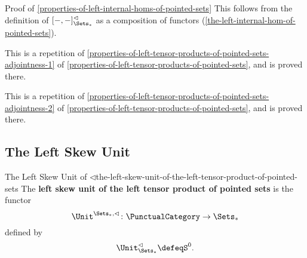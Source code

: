\begin{Proof}{Proof of \cref{properties-of-left-internal-homs-of-pointed-sets}}%
    This follows from the definition of $[-,-]^{\lhd}_{\Sets_{*}}$ as a composition of functors (\cref{the-left-internal-hom-of-pointed-sets}).

    This is a repetition of \cref{properties-of-left-tensor-products-of-pointed-sets-adjointness-1} of \cref{properties-of-left-tensor-products-of-pointed-sets}, and is proved there.

    This is a repetition of \cref{properties-of-left-tensor-products-of-pointed-sets-adjointness-2} of \cref{properties-of-left-tensor-products-of-pointed-sets}, and is proved there.
\end{Proof}
\subsection{The Left Skew Unit}\label{subsection-the-left-skew-unit-of-the-left-tensor-product-of-pointed-sets}
\begin{definition}{The Left Skew Unit of $\lhd$}{the-left-skew-unit-of-the-left-tensor-product-of-pointed-sets}%
    The \textbf{left skew unit of the left tensor product of pointed sets} is the functor
    \[
        \Unit^{\Sets_{*},\lhd}
        \colon
        \PunctualCategory
        \to
        \Sets_{*}
    \]
    defined by
    \[
        \Unit^{\lhd}_{\Sets_{*}}%
        \defeq%
        S^{0}.
    \]%
\end{definition}
